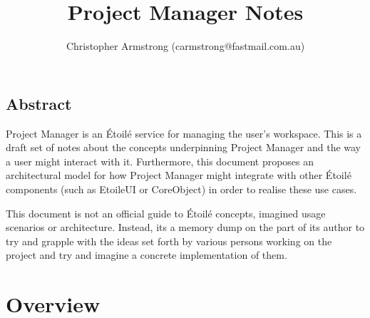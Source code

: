 \documentclass[11pt]{report}
\title{Project Manager Notes}
\author{Christopher Armstrong (carmstrong@fastmail.com.au)}
\newcommand{\etoile}{\'Etoil\'e\xspace}
\newcommand{\proman}{Project Manager\xspace}
\begin{document}
\maketitle
\tableofcontents
\section{Abstract}
\proman is an \etoile service for managing the user's workspace. This is a draft set of notes about the concepts underpinning \proman and the way a user might interact with it. Furthermore, this document proposes an architectural model for how \proman might integrate with other \etoile components (such as EtoileUI or CoreObject) in order to realise these use cases.

This document is not an official guide to \etoile concepts, imagined usage scenarios or architecture. Instead, its a memory dump on the part of its author to try and grapple with the ideas set forth by various persons working on the project and try and imagine a concrete implementation of them.

\chapter{Overview}
\end{document}
